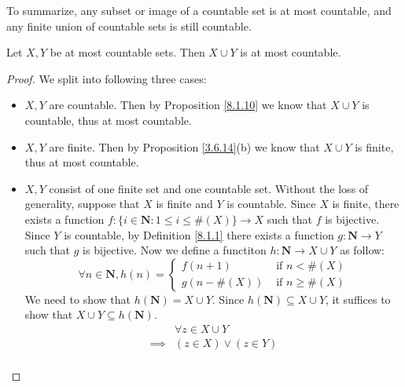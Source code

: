 \begin{note}
    To summarize, any subset or image of a countable set is at most countable, and any finite union of countable sets is still countable.
\end{note}

\begin{additional corollary}\label{ac 8.1.1}
Let \(X, Y\) be at most countable sets.
Then \(X \cup Y\) is at most countable.
\end{additional corollary}

\begin{proof}
    We split into following three cases:
    \begin{itemize}
        \item \(X, Y\) are countable.
              Then by Proposition \ref{8.1.10} we know that \(X \cup Y\) is countable, thus at most countable.
        \item \(X, Y\) are finite.
              Then by Proposition \ref{3.6.14}(b) we know that \(X \cup Y\) is finite, thus at most countable.
        \item \(X, Y\) consist of one finite set and one countable set.
              Without the loss of generality, suppose that \(X\) is finite and \(Y\) is countable.
              Since \(X\) is finite, there exists a function \(f : \{i \in \mathbf{N} : 1 \leq i \leq \#(X)\} \to X\) such that \(f\) is bijective.
              Since \(Y\) is countable, by Definition \ref{8.1.1} there exists a function \(g : \mathbf{N} \to Y\) such that \(g\) is bijective.
              Now we define a functiton \(h : \mathbf{N} \to X \cup Y\) as follow:
              \[
                  \forall n \in \mathbf{N}, h(n) = \begin{cases}
                      f(n + 1)     & \text{ if } n < \#(X)    \\
                      g(n - \#(X)) & \text{ if } n \geq \#(X)
                  \end{cases}
              \]
              We need to show that \(h(\mathbf{N}) = X \cup Y\).
              Since \(h(\mathbf{N}) \subseteq X \cup Y\), it suffices to show that \(X \cup Y \subseteq h(\mathbf{N})\).
              \begin{align*}
                           & \forall z \in X \cup Y                                                         \\
                  \implies & (z \in X) \lor (z \in Y)                                                       \\

\end{align*}
\end{itemize}
\end{proof}
